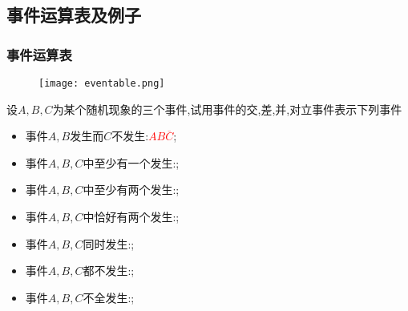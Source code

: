 \subsection{事件运算表及例子}

\begin{frame}
	\frametitle{事件运算表}

	\begin{figure}[htbp]\nonumber

				\centering
				\texttt{[image: eventable.png]}

		\end{figure}

	\vspace{1cm}
	\end{frame}










\begin{frame}
  \begin{exam}
    设$A,B,C$为某个随机现象的三个事件,试用事件的交,差,并,对立事件表示下列事件
    \begin{itemize}[<+-|alert@+>]
    \item 事件$A,B$发生而$C$不发生:\pause\textcolor{red}{$AB\overline{C}$};
    \item 事件$A,B,C$中至少有一个发生:\pause {};
    \item 事件$A,B,C$中至少有两个发生:\pause {};
    \item 事件$A,B, C$中恰好有两个发生:\pause {};
    \item 事件$A,B,C$同时发生:\pause {};
    \item 事件$A,B,C$都不发生:\pause {};
    \item 事件$A,B,C$不全发生:\pause {};
    \end{itemize}

  \end{exam}
\end{frame}

